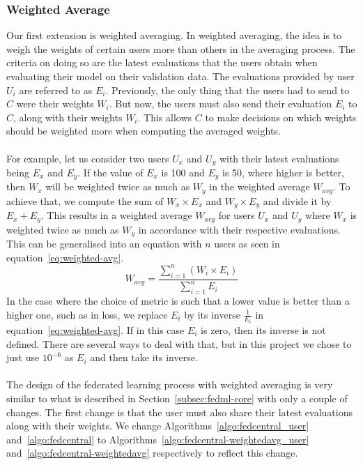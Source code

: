 \documentclass[12pt]{article}
\begin{document}
\subsubsection{Weighted Average}\label{subsubsec:weighted-avg}
Our first extension is weighted averaging. In weighted averaging, the idea is to weigh the weights of certain users more than others in the averaging process. The criteria on doing so are the latest evaluations that the users obtain when evaluating their model on their validation data. The evaluations provided by user $U_i$ are referred to as $E_i$. Previously, the only thing that the users had to send to $C$ were their weights $W_i$. But now, the users must also send their evaluation $E_i$ to $C$, along with their weights $W_i$. This allows $C$ to make decisions on which weights should be weighted more when computing the averaged weights.
\\\\
For example, let us consider two users $U_x$ and $U_y$ with their latest evaluations being $E_x$ and $E_y$. If the value of $E_x$ is 100 and $E_y$ is 50, where higher is better, then $W_x$ will be weighted twice as much as $W_y$ in the weighted average $W_{avg}$. To achieve that, we compute the sum of $W_x \times E_x$ and $W_y \times E_y$ and divide it by $E_x + E_y$. This results in a weighted average $W_{avg}$ for users $U_x$ and $U_y$ where $W_x$ is weighted twice as much as $W_y$ in accordance with their respective evaluations. This can be generalised into an equation with $n$ users as seen in equation~\ref{eq:weighted-avg}.
\begin{equation}\label{eq:weighted-avg}
	W_{avg} = \frac{\sum_{i=1}^{n} \left({W_i \times E_i}\right)}{\sum_{i=1}^{n} {E_i}}
\end{equation}
In the case where the choice of metric is such that a lower value is better than a higher one, such as in loss, we replace $E_i$ by its inverse $\frac{1}{E_i}$ in equation~\ref{eq:weighted-avg}. If in this case $E_i$ is zero, then its inverse is not defined. There are several ways to deal with that, but in this project we chose to just use $10^{-6}$ as $E_i$ and then take its inverse. 
\\\\
The design of the federated learning process with weighted averaging is very similar to what is described in Section~\ref{subsec:fedml-core} with only a couple of changes. The first change is that the user must also share their latest evaluations along with their weights. We change Algorithms~\ref{algo:fedcentral_user} and~\ref{algo:fedcentral} to Algorithms~\ref{algo:fedcentral-weightedavg_user} and~\ref{algo:fedcentral-weightedavg} respectively to reflect this change.
\end{document}
